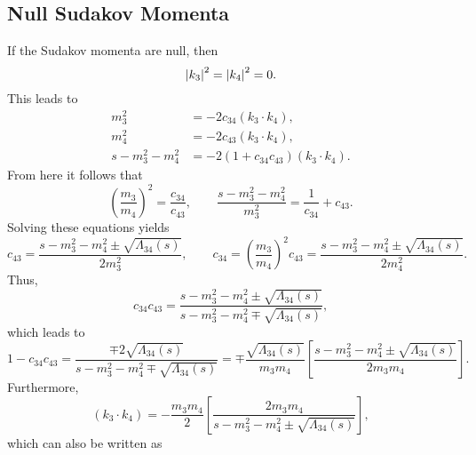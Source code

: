 \subsection{Null Sudakov Momenta}
If the Sudakov momenta are null, then
\begin{equation}
	\left\lvert k_{3} \right\rvert^{2} = \left\lvert k_{4} \right\rvert^{2} = 0.
\end{equation}
This leads to
\begin{equation}
\begin{split}
	m_{3}^{2} &= -2 c_{34} \left(k_{3} \cdot k_{4} \right), \\
	m_{4}^{2} &= -2 c_{43} \left(k_{3} \cdot k_{4} \right), \\
	s - m_{3}^{2} - m_{4}^{2} &= -2\left(1 + c_{34}c_{43} \right) \left(k_{3} \cdot k_{4} \right).
\end{split}
\end{equation}
From here it follows that
\begin{equation}
	\left( \frac{m_{3}}{m_{4}} \right)^{2} = \frac{c_{34}}{c_{43}}, \qquad \frac{s - m_{3}^{2} - m_{4}^{2}}{m_{3}^{2}} = \frac{1}{c_{34}} + c_{43}.
\end{equation}
Solving these equations yields
\begin{equation}
	c_{43} = \frac{s - m_{3}^{2} - m_{4}^{2} \pm \sqrt{\Lambda_{34}(s)}}{2 m_{3}^{2}}, \qquad c_{34} = \left( \frac{m_{3}}{m_{4}} \right)^{2} c_{43} = \frac{s - m_{3}^{2} - m_{4}^{2} \pm \sqrt{\Lambda_{34}(s)}}{2 m_{4}^{2}}.
\end{equation}
Thus,
\begin{equation}
	c_{34} c_{43} = \frac{s - m_{3}^{2} - m_{4}^{2} \pm \sqrt{\Lambda_{34}(s)}}{s - m_{3}^{2} - m_{4}^{2} \mp \sqrt{\Lambda_{34}(s)}},
\end{equation}
which leads to
\begin{equation}
	1 - c_{34} c_{43} = \frac{\mp 2 \sqrt{\Lambda_{34}(s)}}{s - m_{3}^{2} - m_{4}^{2} \mp \sqrt{\Lambda_{34}(s)}} = \mp \frac{\sqrt{\Lambda_{34}(s)}}{m_{3} m_{4}} \left[ \frac{s - m_{3}^{2} - m_{4}^{2} \pm \sqrt{\Lambda_{34}(s)}}{2 m_{3} m_{4}} \right] .
\end{equation}
Furthermore,
\begin{equation}
	\left( k_{3} \cdot k_{4} \right) = - \frac{m_{3} m_{4}}{2} \left[ \frac{2m_{3} m_{4}}{s - m_{3}^{2} - m_{4}^{2} \pm \sqrt{\Lambda_{34}(s)}} \right],
\end{equation}
which can also be written as
